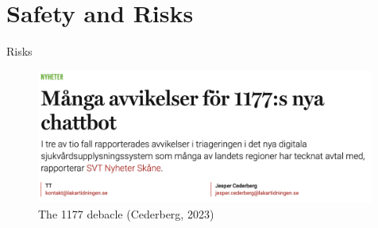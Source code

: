 \documentclass[10pt]{beamer}
\begin{document}
\section{Safety and Risks}

\begin{frame}{Risks}

\begin{figure}[h]
\centering
\includegraphics[width=0.99\textwidth]{fig/cederberg_2023}
\caption{The 1177 debacle (Cederberg, 2023)}
\end{figure}

\end{frame}
\end{document}
